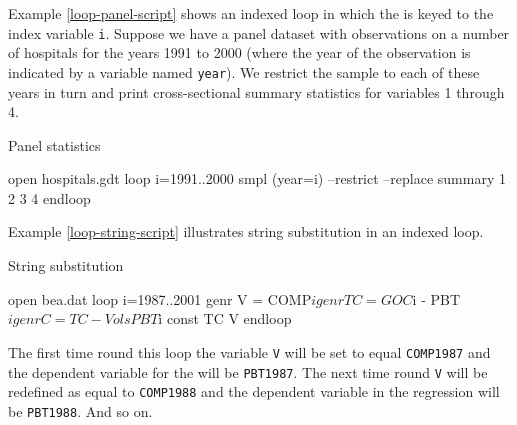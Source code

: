 Example \ref{loop-panel-script} shows an indexed loop in which the
 is keyed to the index variable \verb+i+.  Suppose we have a
panel dataset with observations on a number of hospitals for the years
1991 to 2000 (where the year of the observation is indicated by a
variable named \verb+year+).  We restrict the sample to each of these
years in turn and print cross-sectional summary statistics for
variables 1 through 4.

\begin{script}[htbp]
  \caption{Panel statistics}
  \label{loop-panel-script}
\begin{code}
	  open hospitals.gdt
	  loop i=1991..2000
	    smpl (year=i) --restrict --replace
	    summary 1 2 3 4
	  endloop
\end{code}
\end{script}


Example \ref{loop-string-script} illustrates string substitution in an
indexed loop.

\begin{script}[htbp]
  \caption{String substitution}
  \label{loop-string-script}
\begin{code}
	  open bea.dat
	  loop i=1987..2001
	    genr V = COMP$i
	    genr TC = GOC$i - PBT$i
	    genr C = TC - V
	    ols PBT$i const TC V
	  endloop
\end{code}
\end{script}

The first time round this loop the variable \verb+V+ will be set to
equal \verb+COMP1987+ and the dependent variable for the 
will be \verb+PBT1987+. The next time round \verb+V+ will be redefined
as equal to \verb+COMP1988+ and the dependent variable in the
regression will be \verb+PBT1988+.  And so on.


